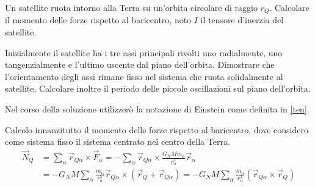 \documentclass[../main.tex]{subfiles}
\begin{document}
\label{ex:crc}

\textex
Un satellite ruota intorno alla Terra su un'orbita circolare di raggio $r_Q$. Calcolare il momento delle forze rispetto al baricentro, noto $I$ il tensore d'inerzia del satellite. 

Inizialmente il satellite ha i tre assi principali rivolti uno radialmente, uno tangenzialmente e l'ultimo uscente dal piano dell'orbita. Dimostrare che l'orientamento degli assi rimane fisso nel sistema che ruota solidalmente al satellite. Calcolare inoltre il periodo delle piccole oscillazioni sul piano dell'orbita.

\solution
Nel corso della soluzione utilizzerò la notazione di Einstein come definita in \cref{ten}.

Calcolo innanzitutto il momento delle forze rispetto al baricentro, dove considero come sistema fisso il sistema centrato nel centro della Terra.
\begin{equation}\label{crc:MomentoForze1}
\begin{split}
	\vec N_Q	&= \sum_\alpha\vec r_{Q\alpha} \times \vec F_\alpha=- \sum_\alpha \vec r_{Q\alpha} \times \frac {G_N M m_\alpha }{r_\alpha^3}\vec r_\alpha \\
			&= -G_NM \sum_\alpha \frac {m_\alpha}{r_\alpha^3}\vec r_{Q\alpha} \times (\vec r_Q+\vec r_{Q\alpha})=-G_NM \sum_\alpha \frac {m_\alpha}{r_\alpha^3}(\vec r_{Q\alpha} \times \vec r_Q)
\end{split}
\end{equation}
\end{document}
